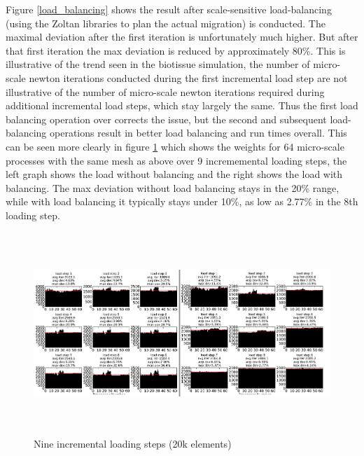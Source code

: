 Figure \ref{load_balancing} shows the result after scale-sensitive load-balancing (using the Zoltan libraries \cite{ZoltanOverviewArticle2002} \cite{ZoltanIsorropiaOverview2012} to plan the actual migration) is conducted. The maximal deviation after the first iteration is unfortunately much higher. But after that first iteration the max deviation is reduced by approximately 80\%. This is illustrative of the trend seen in the biotissue simulation, the number of micro-scale newton iterations conducted during the first incremental load step are not illustrative of the number of micro-scale newton iterations required during additional incremental load steps, which stay largely the same. Thus the first load balancing operation over corrects the issue, but the second and subsequent load-balancing operations result in better load balancing and run times overall. This can be seen more clearly in figure \ref{10_step_lb} which shows the weights for 64 micro-scale processes with the same mesh as above over 9 incrememental loading steps, the left graph shows the load without balancing and the right shows the load with balancing. The max deviation without load balancing stays in the 20\% range, while with load balancing it typically stays under 10\%, as low as 2.77\% in the 8th loading step.

\begin{figure}
  \begin{center}
    \includegraphics[height=3in]{siam_cse_ten.png}
  \end{center}
  \caption{\small Nine incremental loading steps (20k elements)}
  \label{10_step_lb}
\end{figure}
